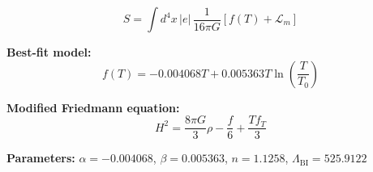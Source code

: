 
\begin{equation}
  S = \int d^4x \, |e| \, \frac{1}{16\pi G} \left[ f(T) + \mathcal{L}_m \right]
\end{equation}

\textbf{Best-fit model:}
\begin{equation}
  f(T) = -0.004068 T + 0.005363 T \ln\!\left(\frac{T}{T_0}\right)
\end{equation}

\textbf{Modified Friedmann equation:}
\begin{equation}
  H^2 = \frac{8\pi G}{3} \rho - \frac{f}{6} + \frac{T f_T}{3}
\end{equation}

\textbf{Parameters:}
$\alpha = -0.004068$, \quad
$\beta = 0.005363$, \quad
$n = 1.1258$, \quad
$\Lambda_{\text{BI}} = 525.9122$